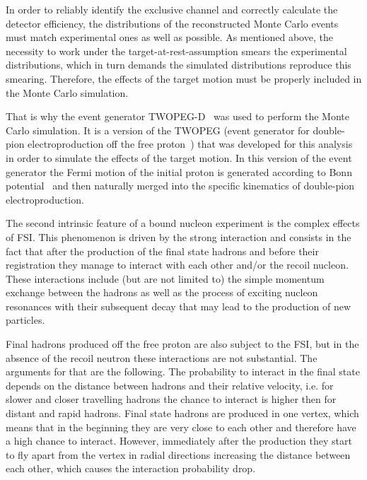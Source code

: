 In order to reliably identify the exclusive channel and correctly calculate the detector efficiency, the distributions of the reconstructed Monte Carlo events must match experimental ones as well as possible. As mentioned above, the necessity to work under the target-at-rest-assumption smears the experimental distributions, which in turn demands the simulated distributions reproduce this smearing. Therefore, the effects of the target motion must be properly included in the Monte Carlo simulation.

That is why the event generator TWOPEG-D~\cite{twopeg-d} was used to perform the Monte Carlo simulation. It is a version of the TWOPEG (event generator for double-pion electroproduction off the free proton~\cite{twopeg}) that was developed for this analysis in order to simulate the effects of the target motion. In this version of the event generator the Fermi motion of the initial proton is generated according to Bonn potential~\cite{Machleidt:1987hj} and then naturally merged into the specific kinematics of double-pion electroproduction.

The second intrinsic feature of a bound nucleon experiment is the complex effects of FSI. This phenomenon is driven by the strong interaction and consists in the fact that after the production of the final state hadrons and before their registration they manage to interact with each other and/or the recoil nucleon. These interactions include (but are not limited to) the simple momentum exchange between the hadrons as well as the process of exciting nucleon resonances with their subsequent decay that may lead to the production of new particles. 


Final hadrons produced off the free proton are also subject to the FSI, but in the absence of the recoil neutron these interactions are not substantial. The arguments for that are the following. The probability to interact in the final state depends on the distance between hadrons and their relative velocity, i.e. for slower and closer travelling hadrons the chance to interact is higher then for distant and rapid hadrons. Final state hadrons are produced in one vertex, which means that in the beginning they are very close to each other and therefore have a high chance to interact. However, immediately after the production they start to fly apart from the vertex in radial directions increasing the distance between each other, which causes the interaction probability drop.





